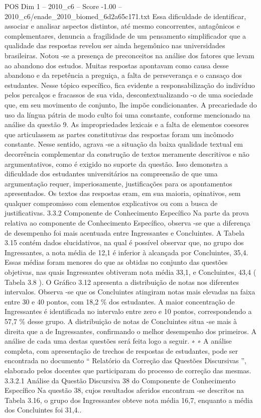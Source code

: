 \begin{textsample}{POS Dim 1 – 2010\_c6 – Score -1.00 – 2010\_c6/enade\_2010\_biomed\_6d2a65c171.txt}
Essa dificuldade de identificar, associar e analisar aspectos distintos, até mesmo concorrentes, antagônicos e complementares, denuncia a fragilidade de um pensamento simplificador que a qualidade das respostas revelou ser ainda hegemônico nas universidades brasileiras.
Notou -se a presença de preconceitos na análise dos fatores que levam ao abandono dos estudos.
Muitas respostas apontavam como causa desse abandono e da repetência a preguiça, a falta de perseverança e o cansaço dos estudantes.
Nesse tópico específico, fica evidente a responsabilização do indivíduo pelos percalços e fracassos de sua vida, descontextualizando -o de uma sociedade que, em seu movimento de conjunto, lhe impõe condicionantes.
A precariedade do uso da língua pátria de modo culto foi uma constante, conforme mencionado na análise da questão 9.
As impropriedades lexicais e a falta de elementos coesores que articulassem as partes constitutivas das respostas foram um incômodo constante.
Nesse sentido, agrava -se a situação da baixa qualidade textual em decorrência complementar da construção de textos meramente descritivos e não argumentativos, como é exigido no suporte da questão.
Isso demonstra a dificuldade dos estudantes universitários na compreensão de que uma argumentação requer, imperiosamente, justificações para os apontamentos apresentados.
Os textos das respostas eram, em sua maioria, opinativos, sem qualquer compromisso com elementos explicativos ou com a busca de justificativas. 3.3.2 Componente de Conhecimento Específico Na parte da prova relativa ao componente de Conhecimento Específico, observa -se que a diferença de desempenho foi mais acentuada entre Ingressantes e Concluintes.
A Tabela 3.15 contém dados elucidativos, na qual é possível observar que, no grupo dos Ingressantes, a nota média de 12,1 é inferior à alcançada por Concluintes, 35,4.
Essas médias foram menores do que as obtidas no conjunto das questões objetivas, nas quais Ingressantes obtiveram nota média 33,1, e Concluintes, 43,4 ( Tabela 3.8 ).
O Gráfico 3.12 apresenta a distribuição de notas nos diferentes intervalos.
Observa -se que os Concluintes atingiram notas mais elevadas na faixa entre 30 e 40 pontos, com 18,2 \% dos estudantes.
A maior concentração de Ingressantes é identificada no intervalo entre zero e 10 pontos, correspondendo a 57,7 \% desse grupo.
A distribuição de notas de Concluintes situa -se mais à direita que a de Ingressantes, confirmando o melhor desempenho dos primeiros.
A análise de cada uma destas questões será feita logo a seguir. ∗ ∗ A análise completa, com apresentação de trechos de respostas de estudantes, pode ser encontrada no documento “ Relatório da Correção das Questões Discursivas ”, elaborado pelos docentes que participaram do processo de correção das mesmas. 3.3.2.1 Análise da Questão Discursiva 38 do Componente de Conhecimento Específico Na questão 38, cujos resultados aferidos encontram -se descritos na Tabela 3.16, o grupo dos Ingressantes obteve nota média 16,7, enquanto a média dos Concluintes foi 31,4..

\end{textsample}
